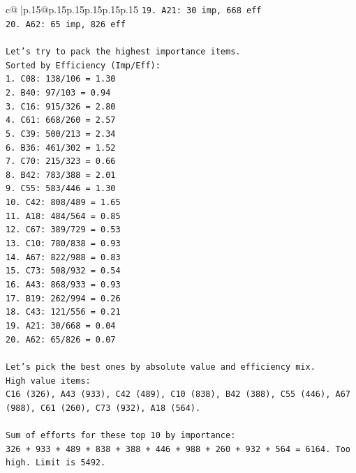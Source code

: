 \documentclass{article}
\begin{document}
{\begin{supertabular}{c@{$\;$}|p{.15\linewidth}@{}p{.15\linewidth}p{.15\linewidth}p{.15\linewidth}p{.15\linewidth}p{.15\linewidth}}
{{{\texttt{19. A21: 30 imp, 668 eff} \\
\texttt{20. A62: 65 imp, 826 eff} \\
\\ 
\texttt{Let's try to pack the highest importance items.} \\
\texttt{Sorted by Efficiency (Imp/Eff):} \\
\texttt{1. C08: 138/106 = 1.30} \\
\texttt{2. B40: 97/103 = 0.94} \\
\texttt{3. C16: 915/326 = 2.80} \\
\texttt{4. C61: 668/260 = 2.57} \\
\texttt{5. C39: 500/213 = 2.34} \\
\texttt{6. B36: 461/302 = 1.52} \\
\texttt{7. C70: 215/323 = 0.66} \\
\texttt{8. B42: 783/388 = 2.01} \\
\texttt{9. C55: 583/446 = 1.30} \\
\texttt{10. C42: 808/489 = 1.65} \\
\texttt{11. A18: 484/564 = 0.85} \\
\texttt{12. C67: 389/729 = 0.53} \\
\texttt{13. C10: 780/838 = 0.93} \\
\texttt{14. A67: 822/988 = 0.83} \\
\texttt{15. C73: 508/932 = 0.54} \\
\texttt{16. A43: 868/933 = 0.93} \\
\texttt{17. B19: 262/994 = 0.26} \\
\texttt{18. C43: 121/556 = 0.21} \\
\texttt{19. A21: 30/668 = 0.04} \\
\texttt{20. A62: 65/826 = 0.07} \\
\\ 
\texttt{Let's pick the best ones by absolute value and efficiency mix.} \\
\texttt{High value items:} \\
\texttt{C16 (326), A43 (933), C42 (489), C10 (838), B42 (388), C55 (446), A67 (988), C61 (260), C73 (932), A18 (564).} \\
\\ 
\texttt{Sum of efforts for these top 10 by importance:} \\
\texttt{326 + 933 + 489 + 838 + 388 + 446 + 988 + 260 + 932 + 564 = 6164. Too high. Limit is 5492.} \\
\\ 
}}}
\end{supertabular}}
\end{document}
